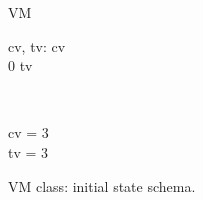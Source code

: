 \begin{figure}[H]
\centering
\begin{class}{VM}
\begin{state}
cv, tv: \integer
{} \leq  cv 
\\
0 \leq  tv 
\end{state} 
\\
\begin{init}
cv = 3
\\tv = 3
\end{init} 
\end{class}
\caption{VM class: initial state schema.}
\label{oz_vm_init_schema}
\end{figure}